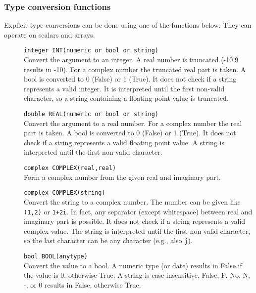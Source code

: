 \subsubsection{Type conversion functions}
Explicit type conversions can be done using one of the functions
below. They can operate on scalars and arrays.
\begin{description}
  \item[] \texttt{integer INT(numeric or bool or string)}\\
    Convert the argument to an integer. A real number is
    truncated (-10.9 results in -10). For a complex number the
    truncated real part is taken. A bool is converted to 0 (False) or 1 (True).
    It does not check if a string represents a valid integer. It is
    interpreted until the first non-valid character, so a string
    containing a floating point value is truncated.
  \item[] \texttt{double REAL(numeric or bool or string)}\\
    Convert the argument to a real number. For a complex number the
    real part is taken. A bool is converted to 0 (False) or 1 (True).
    It does not check if a string represents a valid floating point value.
    A string is interpreted until the first non-valid character.
  \item[] \texttt{complex COMPLEX(real,real)}\\
    Form a complex number from the given real and imaginary part.
  \item[] \texttt{complex COMPLEX(string)}\\
    Convert the string to a complex number. The number can be given
    like \texttt{(1,2)} or \texttt{1+2i}. In fact, any separator
    (except whitespace) between real and imaginary part is possible.
    It does not check if a string represents a valid complex value.
    The string is interpreted until the first non-valid character, so
    the last character can be any character (e.g., also \texttt{j}).
  \item[] \texttt{bool BOOL(anytype)}\\
    Convert the value to a bool. A numeric type (or date) results in False if
    the value is 0, otherwise True.
    A string is case-insensitive. False, F, No, N, -, or 0 results in False, otherwise True.
\end{description}

